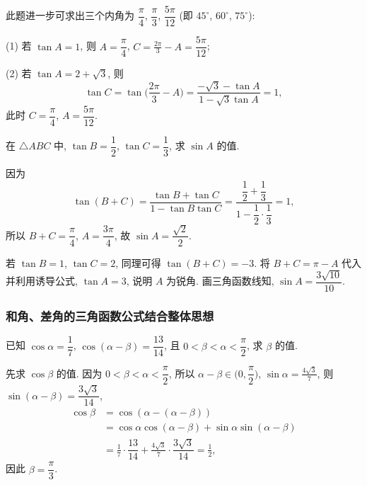     \varexercise 此题进一步可求出三个内角为 $\dfrac\pi4$, $\dfrac{\pi}{3}$, $\dfrac{5\pi}{12}$ (即 $45^\circ$, $60^\circ$, $75^\circ$):

    (1) 若 $\tan A=1$, 则 $A= \dfrac{\pi}{4}$, $C= \frac{2\pi}{3}- A= \dfrac{5\pi}{12}$;
    
    (2) 若 $\tan A=2+\sqrt3$, 则
    \[\tan C= \tan\biggl(\frac{2\pi}3- A\biggr)
        = \frac{-\sqrt3-\tan A}{1-\sqrt 3\tan A}= 1,\]
    此时 $C= \dfrac{\pi}{4}$, $A= \dfrac{5\pi}{12}$.
\endsolution

\lianxi
\begin{exercise}[s]
    在 $\triangle ABC$ 中, $\tan B=\dfrac12$, $\tan C=\dfrac13$,
    求 $\sin A$ 的值.
\end{exercise}
\beginsolution
    因为
    \[\tan(B+C)
    = \frac{\tan B+\tan C}{1-\tan B\tan C}
    = \frac{\dfrac12+ \dfrac13}{1- \dfrac12\cdot\dfrac13}
    = 1,\]
    所以 $B+C= \dfrac\pi4$, $A= \dfrac{3\pi}{4}$, 故 $\sin A= \dfrac{\sqrt2}{2}$.

    \varexercise 若 $\tan B=1$, $\tan C=2$, 同理可得 $\tan(B+C)=-3$. 将 $B+C= \pi-A$ 代入并利用诱导公式, $\tan A= 3$, 说明 $A$ 为锐角. 画三角函数线知, $\sin A= \dfrac{3\sqrt{10}}{10}$.
\endsolution

\subsubsection{和角、差角的三角函数公式结合整体思想}
\begin{example}
    已知 $\cos \alpha=\dfrac17$, $\cos(\alpha-\beta)=\dfrac{13}{14}$, 且 $0<\beta<\alpha< \dfrac\pi2$, 求 $\beta$ 的值.
\end{example}
\beginsolution
    先求 $\cos\beta$ 的值. 
    因为 $0<\beta<\alpha< \dfrac\pi2$, 所以 $\alpha-\beta\in \biggl(0,\dfrac\pi2\biggr)$, $\sin\alpha= \frac{4\sqrt3}{7}$, 则 $\sin(\alpha-\beta)= \dfrac{3\sqrt3}{14}$, 
    \[\begin{aligned}
        \cos\beta
        &= \cos(\alpha- (\alpha-\beta))\\
        &= \cos\alpha\cos(\alpha-\beta)
            + \sin\alpha\sin(\alpha-\beta)\\
        &= \frac17\cdot\dfrac{13}{14}
            + \frac{4\sqrt3}{7}\cdot\dfrac{3\sqrt3}{14}
         = \frac12,
    \end{aligned}\]
    因此 $\beta= \dfrac{\pi}{3}$.
\endsolution

